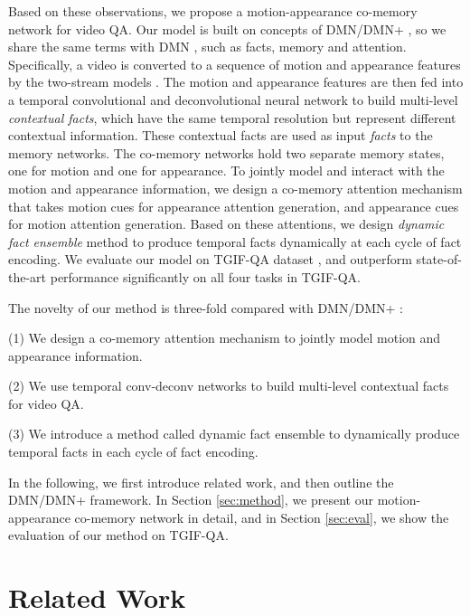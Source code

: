 \documentclass[10pt,twocolumn,letterpaper]{article}
\begin{document}
Based on these observations, we propose a motion-appearance co-memory network for video QA. Our model is built on concepts of DMN/DMN+ \cite{kumar2016ask, xiong2016dynamic}, so we share the same terms with DMN \cite{kumar2016ask}, such as facts, memory and attention. Specifically, a video is converted to a sequence of motion and appearance features by the two-stream models \cite{xiong2016cuhk}. The motion and appearance features are then fed into a temporal convolutional and deconvolutional neural network to build multi-level \textit{contextual facts}, which have the same temporal resolution but represent different contextual information. These contextual facts are used as input \textit{facts} to the memory networks. The co-memory networks hold two separate memory states, one for motion and one for appearance. To jointly model and interact with the motion and appearance information, we design a co-memory attention mechanism that takes motion cues for appearance attention generation, and appearance cues for motion attention generation. Based on these attentions, we design \textit{dynamic fact ensemble} method to produce temporal facts dynamically at each cycle of fact encoding. We evaluate our model on TGIF-QA dataset \cite{Jang_2017_CVPR}, and outperform state-of-the-art performance significantly on all four tasks in TGIF-QA.

The novelty of our method is three-fold compared with DMN/DMN+ \cite{kumar2016ask, xiong2016dynamic}:

(1) We design a co-memory attention mechanism to jointly model motion and appearance information.

(2) We use temporal conv-deconv networks to build multi-level contextual facts for video QA.

(3) We introduce a method called dynamic fact ensemble to dynamically produce temporal facts in each cycle of fact encoding.


In the following, we first introduce related work, and then outline the DMN/DMN+ framework. In Section \ref{sec:method}, we present our motion-appearance co-memory network in detail, and in Section \ref{sec:eval}, we show the evaluation of our method on TGIF-QA.  

\section{Related Work}
\end{document}

